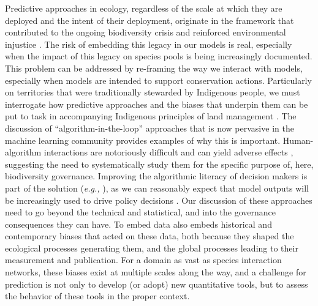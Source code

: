Predictive approaches in ecology, regardless of the scale at which they
are deployed and the intent of their deployment, originate in the
framework that contributed to the ongoing biodiversity crisis
\cite{Adam2014Elephant} and reinforced environmental injustice
\cite{Choudry2013Saving, Dominguez2020Decolonising}. The risk of
embedding this legacy in our models is real, especially when the impact
of this legacy on species pools is being increasingly documented. This
problem can be addressed by re-framing the way we interact with models,
especially when models are intended to support conservation actions.
Particularly on territories that were traditionally stewarded by
Indigenous people, we must interrogate how predictive approaches and the
biases that underpin them can be put to task in accompanying Indigenous
principles of land management \cite{Eichhorn2019Steps,
Nokmaq2021Awakening}. The discussion of ``algorithm-in-the-loop''
approaches that is now pervasive in the machine learning community
provides examples of why this is important. Human-algorithm interactions
are notoriously difficult and can yield adverse effects
\cite{Green2019Disparate, Stevenson2021Algorithmic}, suggesting the
need to systematically study them for the specific purpose of, here,
biodiversity governance. Improving the algorithmic literacy of decision
makers is part of the solution (\emph{e.g.,} \cite{Lamba2019Deep, 
MoseboFernandes2020Machine}), as we can reasonably expect that model
outputs will be increasingly used to drive policy decisions
\cite{Weiskopf2022Increasing}. Our discussion of these approaches need
to go beyond the technical and statistical, and into the governance
consequences they can have. To embed data also embeds historical and
contemporary biases that acted on these data, both because they shaped
the ecological processes generating them, and the global processes
leading to their measurement and publication. For a domain as vast as
species interaction networks, these biases exist at multiple scales
along the way, and a challenge for prediction is not only to develop (or
adopt) new quantitative tools, but to assess the behavior of these tools
in the proper context.

